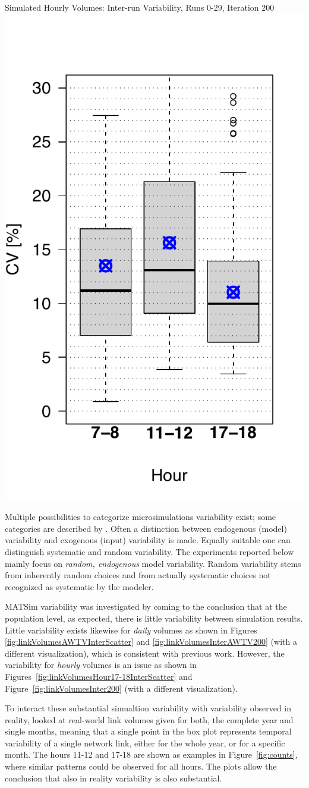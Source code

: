 {	{\label{fig:H1718}}%
  {}%
	\createsubfigure%
  {Simulated Hourly Volumes: Inter-run Variability, Runs 0-29, Iteration 200}%
	{\includegraphics[height=0.3\textwidth]{understanding/figures/var/linkVolumesInter200.pdf}}%
	{\label{fig:linkVolumesInter200}}%
  {}%
}%
{}

Multiple possibilities to categorize microsimulations variability exist; some categories are described by \citet[][]{HorniEtAl_TechRep_IVT_2011_b}. Often a distinction between endogenous (model) variability and exogenous (input) variability is made. Equally suitable one can distinguish systematic and random variability. The experiments reported below mainly focus on \emph{random, endogenous} model variability. Random variability stems from inherently random choices and from actually systematic choices not recognized as systematic by the modeler.

MATSim variability was investigated by \citet[][]{HorniEtAl_TechRep_IVT_2011_b, HorniEtAl_STRC_2011, Dayte_TechRep_IVT_2012} coming to the conclusion that at the population level, as expected, there is little variability between simulation results. Little variability exists likewise for \emph{daily} volumes as shown in Figures \ref{fig:linkVolumesAWTVInterScatter} and \ref{fig:linkVolumesInterAWTV200} (with a different visualization), which is consistent with previous work. However, the variability for \emph{hourly} volumes is an issue as shown in Figures~\ref{fig:linkVolumesHour17-18InterScatter} and Figure~\ref{fig:linkVolumesInter200} (with a different visualization).

To interact these substantial simualtion variability with variability observed in reality, \citet[][]{HorniEtAl_STRC_2011} looked at real-world link volumes given for both, the complete year and single months, meaning that a single point in the box plot represents temporal variability of a single network link, either for the whole year, or for a specific month. The hours 11-12 and 17-18 are shown as examples in Figure~\ref{fig:counts}, where similar patterns could be observed for all hours. The plots allow the conclusion that also in reality variability is also substantial.

